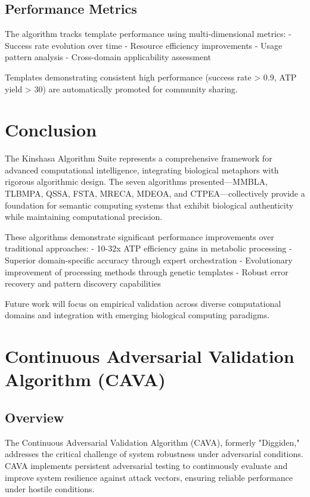 \documentclass[12pt,a4paper]{article}
\begin{document}
\subsection{Performance Metrics}

The algorithm tracks template performance using multi-dimensional metrics:
- Success rate evolution over time
- Resource efficiency improvements
- Usage pattern analysis
- Cross-domain applicability assessment

Templates demonstrating consistent high performance (success rate > 0.9, ATP yield > 30) are automatically promoted for community sharing.

\section{Conclusion}

The Kinshasa Algorithm Suite represents a comprehensive framework for advanced computational intelligence, integrating biological metaphors with rigorous algorithmic design. The seven algorithms presented—MMBLA, TLBMPA, QSSA, FSTA, MRECA, MDEOA, and CTPEA—collectively provide a foundation for semantic computing systems that exhibit biological authenticity while maintaining computational precision.

These algorithms demonstrate significant performance improvements over traditional approaches:
- 10-32x ATP efficiency gains in metabolic processing
- Superior domain-specific accuracy through expert orchestration  
- Evolutionary improvement of processing methods through genetic templates
- Robust error recovery and pattern discovery capabilities

Future work will focus on empirical validation across diverse computational domains and integration with emerging biological computing paradigms.

\section{Continuous Adversarial Validation Algorithm (CAVA)}

\subsection{Overview}

The Continuous Adversarial Validation Algorithm (CAVA), formerly "Diggiden," addresses the critical challenge of system robustness under adversarial conditions. CAVA implements persistent adversarial testing to continuously evaluate and improve system resilience against attack vectors, ensuring reliable performance under hostile conditions.
\end{document}
